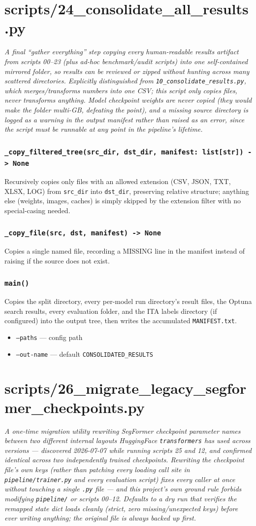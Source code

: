 \documentclass[11pt]{article}
\newcommand{\role}[1]{\par\noindent\textit{#1}\par\vspace{0.5em}}
\newcommand{\func}[1]{\subsubsection*{\texttt{#1}}}
\newcommand{\cliarg}[2]{\item \texttt{#1} --- #2}
\begin{document}
\section{scripts/24\_consolidate\_all\_results.py}
\role{A final ``gather everything'' step copying every human-readable results
artifact from scripts 00--23 (plus ad-hoc benchmark/audit scripts) into one
self-contained mirrored folder, so results can be reviewed or zipped without
hunting across many scattered directories. Explicitly distinguished from
\texttt{10\_consolidate\_results.py}, which merges/transforms numbers into one
CSV; this script only copies files, never transforms anything. Model
checkpoint weights are never copied (they would make the folder multi-GB,
defeating the point), and a missing source directory is logged as a warning in
the output manifest rather than raised as an error, since the script must be
runnable at any point in the pipeline's lifetime.}

\func{\_copy\_filtered\_tree(src\_dir, dst\_dir, manifest: list[str]) -> None}
Recursively copies only files with an allowed extension (CSV, JSON, TXT, XLSX,
LOG) from \texttt{src\_dir} into \texttt{dst\_dir}, preserving relative
structure; anything else (weights, images, caches) is simply skipped by the
extension filter with no special-casing needed.

\func{\_copy\_file(src, dst, manifest) -> None}
Copies a single named file, recording a MISSING line in the manifest instead of
raising if the source does not exist.

\func{main()}
Copies the split directory, every per-model run directory's result files, the
Optuna search results, every evaluation folder, and the ITA labels directory
(if configured) into the output tree, then writes the accumulated
\texttt{MANIFEST.txt}.

\begin{itemize}[nosep]
\cliarg{--paths}{config path}
\cliarg{--out-name}{default \texttt{CONSOLIDATED\_RESULTS}}
\end{itemize}

\section{scripts/26\_migrate\_legacy\_segformer\_checkpoints.py}
\role{A one-time migration utility rewriting SegFormer checkpoint parameter
names between two different internal layouts HuggingFace \texttt{transformers}
has used across versions --- discovered 2026-07-07 while running scripts 25 and
12, and confirmed identical across two independently trained checkpoints.
Rewriting the checkpoint file's own keys (rather than patching every loading
call site in \texttt{pipeline/trainer.py} and every evaluation script) fixes
every caller at once without touching a single \texttt{.py} file --- and this
project's own ground rule forbids modifying \texttt{pipeline/} or scripts
00--12. Defaults to a dry run that verifies the remapped state dict loads
cleanly (strict, zero missing/unexpected keys) before ever writing anything;
the original file is always backed up first.}
\end{document}
